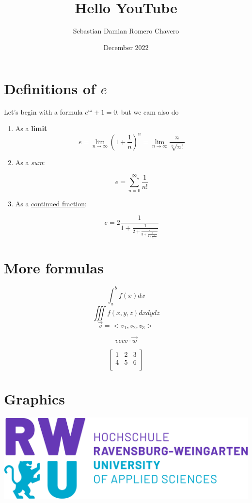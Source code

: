\documentclass{article}
\title{Hello YouTube}
\author{Sebastian Damian Romero Chavero}
\date{December 2022}
\begin{document}
\maketitle

\section{Definitions of $e$}
Let's begin with a formula $e^{i\pi}+1=0$. but we cam also do 

\begin{enumerate}
    \item As a \textbf{limit}
    $$ e=\lim_{n\to\infty} \left(1+\frac{1}{n}\right)^n = 
    \lim_{n\to\infty}\frac{n}{\sqrt[n]{n!}}$$


    \item As a \textit{sum}:

    $$ e=\sum_{n=0}^{\infty} \frac{1}{n!} $$
    
    \item As a \underline{continued fraction}:

    $$e=2\frac{1}{1+\frac{1}{2+\frac{2}{3+\frac{3}{4+\frac{4}{5+\ddots}}}}}$$

\end{enumerate}

\section{More formulas}

$$\int_a^bf(x)dx$$
$$\iiint f(x,y,z)dxdydz$$
$$\vec{v}=<v_1, v_2, v_3>$$

$$vec{v}\cdot \Vec{w}$$

$$\begin{bmatrix}
1 & 2 & 3 \\
4 & 5 & 6 \\
\end{bmatrix}
$$

\section{Graphics}
\includegraphics[scale=0.30]{rwu_logo_hor-lila-cyan_rgb_0-2950056503.png}
\end{document}
